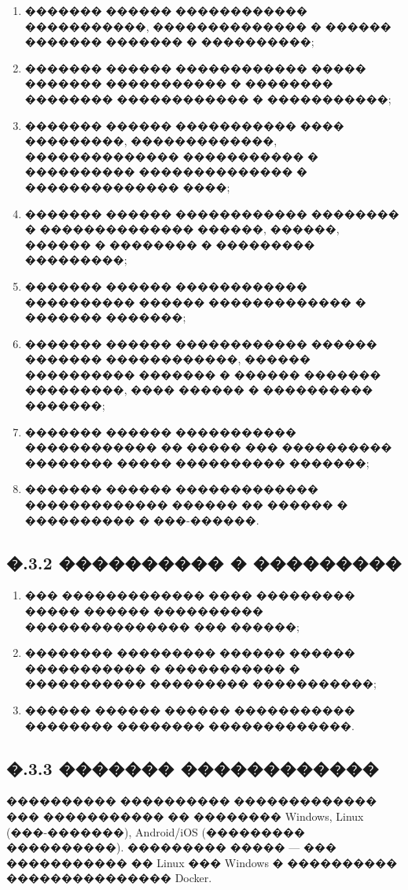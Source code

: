 \begin{enumerate}
  \item ������� ������ ������������ �����������, �������������� � ������ ������� ������� � ����������;
  \item ������� ������ ������������ ����� ������� ����������� � �������� �������� ������������ � �����������;
  \item ������� ������ ����������� ���� ���������, �������������, �������������� ����������� � ���������� �������������� � �������������� ����;
  \item ������� ������ ������������ �������� � �������������� ������, ������, ������ � �������� � ��������� ���������;
  \item ������� ������ ������������ ���������� ������ ������������� � ������� �������;
  \item ������� ������ ������������ ������ ������� ������������, ������ ���������� ������� � ������ ������� ���������, ���� ������ � ���������� �������;
  \item ������� ������ ����������� ������������ �� ����� ��� ���������� �������� ����� ���������� �������;
  \item ������� ������ ������������� ������������� ������ �� ������ � ���������� � ���-������.
\end{enumerate}

\subsection*{�.3.2 ���������� � ���������}

\begin{enumerate}
  \item ��� ������������� ���� ��������� ����� ������ ���������� ��������������� ��� ������;
  \item �������� ��������� ������ ������ ����������� � ����������� � ����������� ��������� �����������;
  \item ������ ������ ������ ����������� �������� �������� �������������.
\end{enumerate}

\subsection*{�.3.3 ������� ������������}

���������� ���������� ������������� ��� ����������� �� �������� Windows, Linux (���-�������), Android/iOS (��������� ����������). ��������� ����� --- ��� ����������� �� Linux ��� Windows � ���������� ��������������� Docker.

